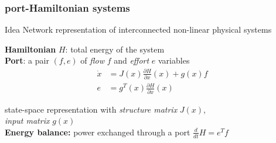 \documentclass[student]{ITRslides}
\begin{document}
\begin{frame}
	\frametitle{port-Hamiltonian systems}
	\begin{block}{Idea}
	Network representation of interconnected non-linear physical systems
	\end{block}	
	\textbf{Hamiltonian} $H$: total energy of the system\\
		\textbf{Port}: a pair $(f,e)$ of \emph{flow} $f$ and \emph{effort} $e$ variables\\
	\begin{align*}
		 \dot{x} &= J(x)\frac{\partial H}{\partial x}(x) +g(x)f \\
e &= g^T(x)\frac{\partial H}{\partial x}(x)
	\end{align*}

	state-space representation with \emph{structure matrix} $J(x)$,\\ \emph{input matrix} $g(x)$ \\

	\textbf{Energy balance:} power exchanged through a port $ \frac{d}{dt}H = e^Tf $
	
	

%	
		

\end{frame}
\end{document}
